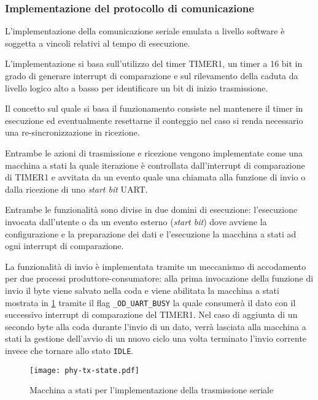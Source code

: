 \subsubsection{Implementazione del protocollo di comunicazione}

L'implementazione della comunicazione seriale emulata a livello software è soggetta a vincoli relativi al tempo di esecuzione.

L'implementazione si basa sull'utilizzo del timer TIMER1, un timer a 16 bit in grado di generare interrupt di comparazione e sul rilevamento della caduta da livello logico alto a basso per identificare un bit di inizio trasmissione.

Il concetto sul quale si basa il funzionamento consiste nel mantenere il timer in esecuzione ed eventualmente resettarne il conteggio nel caso si renda necessario una re-sincronizzazione in ricezione.

Entrambe le azioni di trasmissione e ricezione vengono implementate come una macchina a stati la quale iterazione è controllata dall'interrupt di comparazione di TIMER1 e avvitata da un evento quale una chiamata alla funzione di invio o dalla ricezione di uno \textit{start bit} UART.\@

Entrambe le funzionalità sono divise in due domini di esecuzione: l'esecuzione invocata dall'utente o da un evento esterno (\textit{start bit}) dove avviene la configurazione e la preparazione dei dati e l'esecuzione la macchina a stati ad ogni interrupt di comparazione. 

La funzionalità di invio è implementata tramite un meccanismo di accodamento per due processi produttore-consumatore: alla prima invocazione della funzione di invio il byte viene salvato nella coda e viene abilitata la macchina a stati mostrata in \cref{fig:phy-state-tx} tramite il flag \texttt{\_OD\_UART\_BUSY} la quale consumerà il dato con il successivo interrupt di comparazione del TIMER1.
Nel caso di aggiunta di un secondo byte alla coda durante l'invio di un dato, verrà lasciata alla macchina a stati la gestione dell'avvio di un nuovo ciclo una volta terminato l'invio corrente invece che tornare allo stato \texttt{IDLE}. 

\begin{figure}[t]
    \centering
    \texttt{[image: phy-tx-state.pdf]}
    \caption[]{Macchina a stati per l'implementazione della trasmissione seriale}\label{fig:phy-state-tx}
\end{figure}

